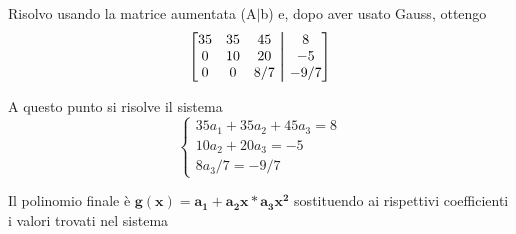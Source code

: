 Risolvo usando la matrice aumentata (A$\mid$b) e, dopo aver usato Gauss, ottengo
$$\begin{bmatrix}
35 & 35 & 45 & \aug & 8\\
0 & 10 & 20 &\aug & -5\\
0 & 0 & 8/7 &\aug & -9/7
\end{bmatrix}
$$

A questo punto si risolve il sistema
$$\left\{
  \begin{array}{lr}
    35a_1 + 35a_2 + 45a_3 = 8 \\
    10a_2 + 20a_3 = -5 \\
    8a_3/7 = -9/7 
  \end{array}
\right.
$$

Il polinomio finale è $\boldsymbol{g(x) = a_1 + a_2x * a_3x^2}$ sostituendo ai rispettivi coefficienti i valori trovati nel sistema

